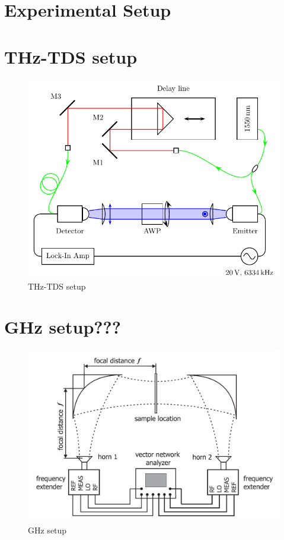 \section{Experimental Setup}

\section{THz-TDS setup}
\begin{figure}[h]
    \centering
    \includegraphics{images/3_chapter03/Setup1_TDS.pdf}
    \caption{THz-TDS setup}
    \label{fig:THz_setup}
\end{figure}


\section{GHz setup???}
\begin{figure}[h]
    \centering
    \includegraphics[scale=0.5]{images/3_chapter03/ghz.png}
    \caption{GHz setup}
    \label{fig:GHz_setup}
\end{figure}

